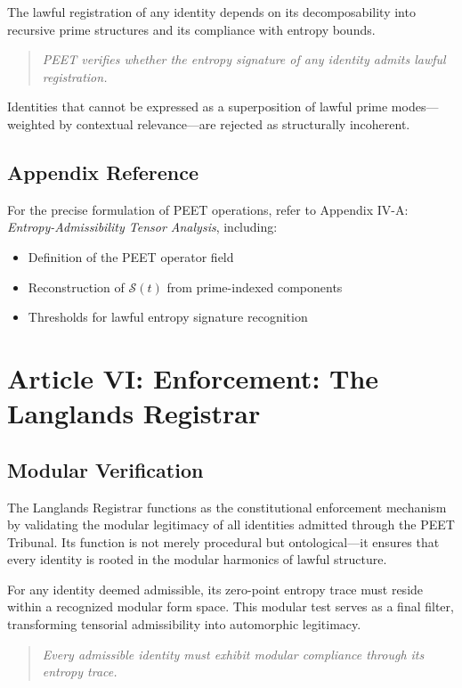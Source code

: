 \documentclass[12]{amsart}
\theoremstyle{plain}
\begin{document}
The lawful registration of any identity depends on its decomposability into recursive prime structures and its compliance with entropy bounds.

\begin{quote}
\textit{PEET verifies whether the entropy signature of any identity admits lawful registration.}
\end{quote}

Identities that cannot be expressed as a superposition of lawful prime modes—weighted by contextual relevance—are rejected as structurally incoherent.

\subsection*{Appendix Reference}

For the precise formulation of PEET operations, refer to Appendix IV-A: \textit{Entropy-Admissibility Tensor Analysis}, including:

\begin{itemize}
  \item Definition of the PEET operator field
  \item Reconstruction of $\mathcal{S}(t)$ from prime-indexed components
  \item Thresholds for lawful entropy signature recognition
\end{itemize}


\section{Article VI: Enforcement: The Langlands Registrar}

\subsection{Modular Verification}

The Langlands Registrar functions as the constitutional enforcement mechanism by validating the modular legitimacy of all identities admitted through the PEET Tribunal. Its function is not merely procedural but ontological—it ensures that every identity is rooted in the modular harmonics of lawful structure.

For any identity deemed admissible, its zero-point entropy trace must reside within a recognized modular form space. This modular test serves as a final filter, transforming tensorial admissibility into automorphic legitimacy.

\begin{quote}
\textit{Every admissible identity must exhibit modular compliance through its entropy trace.}
\end{quote}
\end{document}
